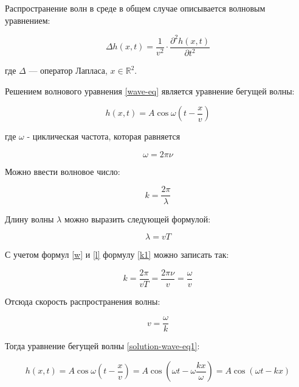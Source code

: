 Распространение волн в среде в общем случае описывается волновым уравнением:

\begin{equation}
    \label{wave-eq}
    \Delta h(x,t) = \frac{1}{v^2} \cdot \frac{\partial ^2h(x,t)}{\partial t^2}
\end{equation}

где $\Delta$ --- оператор Лапласа, $x \in \mathbb{R}^2$. 

Решением волнового уравнения \ref{wave-eq} является уравнение бегущей волны:

\begin{equation}
    \label{solution-wave-eq1}
    h(x,t) = A \cos \omega (t - \frac{x}{v})
\end{equation}

где $\omega$ - циклическая частота, которая равняется

\begin{equation}
    \label{w}
    \omega = 2\pi \nu
\end{equation}

Можно ввести волновое число:

\begin{equation}
    \label{k1}
    k = \frac{2\pi}{\lambda}
\end{equation}

Длину волны $\lambda$ можно выразить следующей формулой:

\begin{equation}
    \label{l}
    \lambda = vT
\end{equation}

С учетом формул \ref{w} и \ref{l} формулу \ref{k1} можно записать так:

\begin{equation}
    \label{k2}
    k = \frac{2\pi}{vT} = \frac{2\pi \nu}{v} = \frac{\omega}{v}
\end{equation}

Отсюда скорость распространения волны:

\begin{equation}
    \label{speed}
    v = \frac{\omega}{k}
\end{equation}

Тогда уравнение бегущей волны \ref{solution-wave-eq1}:

\begin{equation}
    \label{solution-wave-eq2}
    h(x,t) = A \cos \omega (t - \frac{x}{v}) = A \cos (\omega t - \omega \frac{kx}{\omega}) = A \cos (\omega t - kx)
\end{equation}

